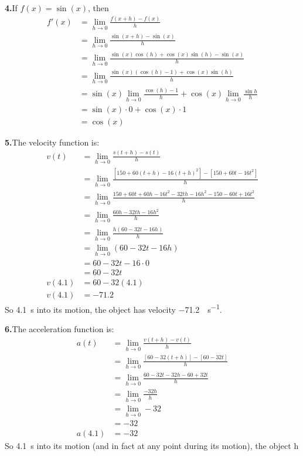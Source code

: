\documentclass[10pt,oneside,]{book}
\theoremstyle{plain}
\theoremstyle{definition}
\numberwithin{equation}{section}
\newcommand{\fe}[2]{#1\mathopen{}\left(#2\right)\mathclose{}}
\newcommand{\fd}[1]{#1'}
\begin{document}
\par\smallskip
\noindent\textbf{4.}\quad{}If \(\fe{f}{x}=\fe{\sin}{x}\), then \begin{align*}
\fe{\fd{f}}{x}&=\lim_{h\to0}\frac{\fe{f}{x+h}-\fe{f}{x}}{h}\\
&=\lim_{h\to0}\frac{\fe{\sin}{x+h}-\fe{\sin}{x}}{h}\\
&=\lim_{h\to0}\frac{\fe{\sin}{x}\fe{\cos}{h}+\fe{\cos}{x}\fe{\sin}{h}-\fe{\sin}{x}}{h}\\
&=\lim_{h\to0}\frac{\fe{\sin}{x}\left(\fe{\cos}{h}-1\right)+\fe{\cos}{x}\fe{\sin}{h}}{h}\\
&=\fe{\sin}{x}\lim_{h\to0}\frac{\fe{\cos}{h}-1}{h}+\fe{\cos}{x}\lim_{h\to0}\frac{\sin{h}}{h}\\
&=\fe{\sin}{x}\cdot0+\fe{\cos}{x}\cdot1\\
&=\fe{\cos}{x}
\end{align*}%
\par\smallskip
\noindent\textbf{5.}\quad{}The velocity function is:\begin{align*}
\fe{v}{t}&=\lim_{h\to0}\frac{\fe{s}{t+h}-\fe{s}{t}}{h}\\
&=\lim_{h\to0}\frac{\left[150+60(t+h)-16(t+h)^2\right]-\left[150+60t-16t^2\right]}{h}\\
&=\lim_{h\to0}\frac{150+60t+60h-16t^2-32th-16h^2-150-60t+16t^2}{h}\\
&=\lim_{h\to0}\frac{60h-32th-16h^2}{h}\\
&=\lim_{h\to0}\frac{h(60-32t-16h)}{h}\\
&=\lim_{h\to0}(60-32t-16h)\\
&=60-32t-16\cdot0\\
&=60-32t\\
\fe{v}{4.1}&=60-32(4.1)\\
\fe{v}{4.1}&=-71.2
\end{align*}So \SI{4.1}{\second} into its motion, the object has velocity \SI{-71.2}{\foot\per\second}.%
\par\smallskip
\noindent\textbf{6.}\quad{}The acceleration function is:\begin{align*}
\fe{a}{t}&=\lim_{h\to0}\frac{\fe{v}{t+h}-\fe{v}{t}}{h}\\
&=\lim_{h\to0}\frac{\left[60-32(t+h)\right]-\left[60-32t\right]}{h}\\
&=\lim_{h\to0}\frac{60-32t-32h-60+32t}{h}\\
&=\lim_{h\to0}\frac{-32h}{h}\\
&=\lim_{h\to0}-32\\
&=-32\\
\fe{a}{4.1}&=-32
\end{align*}So \SI{4.1}{\second} into its motion (and in fact at any point during its motion), the object h
\end{document}
